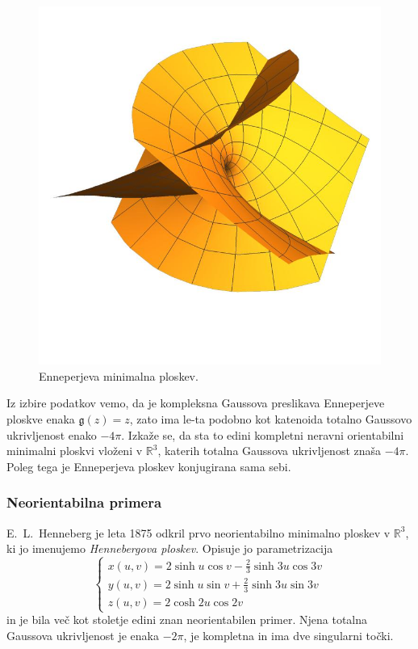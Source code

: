 \documentclass[12pt,a4paper,twoside]{article}
\theoremstyle{definition} %
\theoremstyle{plain} %
\numberwithin{equation}{section}  %
\newcommand{\R}{\mathbb R}
\begin{document}
\begin{figure}[h!]
\begin{center}
\includegraphics[scale=0.8]{images/enneper.jpg}
\caption{Enneperjeva minimalna ploskev.}
\end{center}
\end{figure}

Iz izbire podatkov vemo, da je kompleksna Gaussova preslikava Enneperjeve ploskve enaka $\mathfrak{g}(z) = z$, zato ima le-ta podobno kot katenoida totalno Gaussovo ukrivljenost enako $-4 \pi$. Izkaže se, da sta to edini kompletni neravni orientabilni minimalni ploskvi vloženi v $\mathbb{R}^3$, katerih totalna Gaussova ukrivljenost znaša $-4 \pi$. Poleg tega je Enneperjeva ploskev konjugirana sama sebi.

\subsubsection{Neorientabilna primera}
%
E.~L.~Henneberg je leta 1875 odkril prvo neorientabilno minimalno ploskev v $\R^3$, ki jo imenujemo \emph{Hennebergova ploskev}.
Opisuje jo parametrizacija
%
\begin{equation}
\begin{cases}
x(u,v) = 2 \sinh u \cos v -\frac{2}{3} \sinh 3u \cos 3v \\
y(u,v) = 2 \sinh u \sin v + \frac{2}{3} \sinh 3u \sin 3v \\
z(u,v) = 2 \cosh 2u \cos 2v
\end{cases}
\end{equation}
in je bila več kot stoletje edini znan neorientabilen primer. Njena totalna Gaussova ukrivljenost je enaka $-2 \pi$, je kompletna in ima dve singularni točki.
\end{document}

